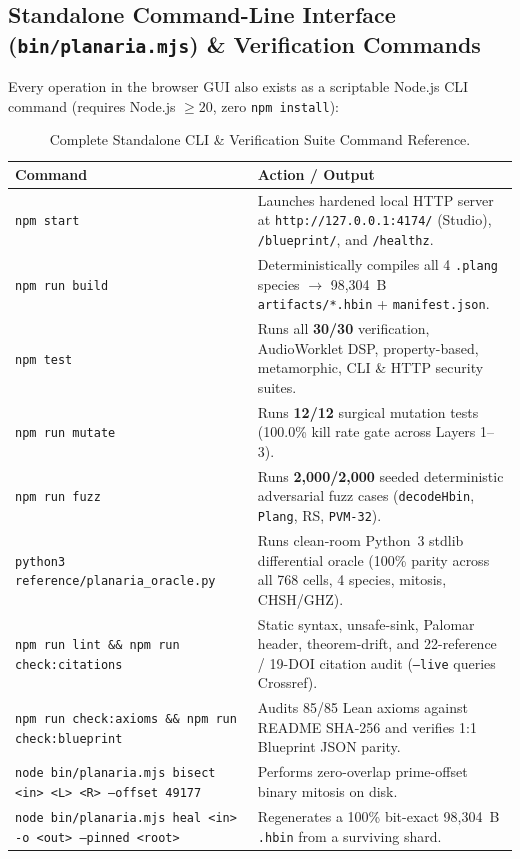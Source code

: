 \documentclass[10pt,letterpaper]{article}
\begin{document}
\subsection{Standalone Command-Line Interface (\texttt{bin/planaria.mjs}) \& Verification Commands}
\label{sec:cli}

Every operation in the browser GUI also exists as a scriptable Node.js CLI command (requires Node.js $\ge 20$, zero \texttt{npm install}):

\begin{table}[ht]
\centering
\caption{Complete Standalone CLI \& Verification Suite Command Reference.}
\label{tab:cli}
\footnotesize
\begin{tabularx}{\textwidth}{@{} L{6.8cm} Y @{}}
\toprule
\textbf{Command} & \textbf{Action / Output} \\
\midrule
\texttt{npm start} & Launches hardened local HTTP server at \nolinkurl{http://127.0.0.1:4174/} (Studio), \texttt{/blueprint/}, and \texttt{/healthz}. \\
\texttt{npm run build} & Deterministically compiles all 4 \texttt{.plang} species $\to$ 98,304~B \texttt{artifacts/*.hbin} + \texttt{manifest.json}. \\
\texttt{npm test} & Runs all \textbf{30/30} verification, AudioWorklet DSP, property-based, metamorphic, CLI \& HTTP security suites. \\
\texttt{npm run mutate} & Runs \textbf{12/12} surgical mutation tests (100.0\% kill rate gate across Layers 1--3). \\
\texttt{npm run fuzz} & Runs \textbf{2,000/2,000} seeded deterministic adversarial fuzz cases (\texttt{decodeHbin}, \texttt{Plang}, RS, \texttt{PVM-32}). \\
\texttt{python3 reference/planaria\_oracle.py} & Runs clean-room Python~3 stdlib differential oracle (100\% parity across all 768 cells, 4 species, mitosis, CHSH/GHZ). \\
\texttt{npm run lint \&\& npm run check:citations} & Static syntax, unsafe-sink, Palomar header, theorem-drift, and 22-reference / 19-DOI citation audit (\texttt{--live} queries Crossref). \\
\texttt{npm run check:axioms \&\& npm run check:blueprint} & Audits 85/85 Lean axioms against README SHA-256 and verifies 1:1 Blueprint JSON parity. \\
\texttt{node bin/planaria.mjs bisect <in> <L> <R> --offset 49177} & Performs zero-overlap prime-offset binary mitosis on disk. \\
\texttt{node bin/planaria.mjs heal <in> -o <out> --pinned <root>} & Regenerates a 100\% bit-exact 98,304~B \texttt{.hbin} from a surviving shard. \\

\end{tabularx}
\end{table}
\end{document}
